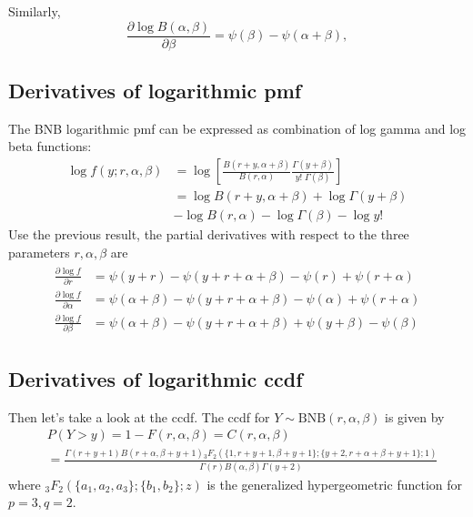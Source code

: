 \documentclass[11pt]{article}
\begin{document}
Similarly,
\begin{equation}
  \frac{\partial \log B(\alpha,\beta)}{\partial \beta} = \psi(\beta) - \psi(\alpha+\beta),
\end{equation}


\subsection*{Derivatives of logarithmic pmf}

 The BNB logarithmic pmf can be expressed as combination of log gamma and log beta functions:
\begin{equation}
\begin{aligned}
	\log f(y;r, \alpha ,\beta) &= \log\left[ \frac {B (r+y,\alpha +\beta )}{B (r,\alpha )} \frac {\Gamma (y+\beta )}{y!\;\Gamma (\beta )} \right] \\
	&= \log B (r+y,\alpha +\beta ) + \log \Gamma (y+\beta ) \\ 
	&- \log B (r,\alpha ) - \log \Gamma (\beta ) - \log y!
\end{aligned}
\end{equation}
Use the previous result, the partial derivatives with respect to the three parameters $r, \alpha, \beta$ are
\begin{subequations}
\begin{gather}
\begin{align}
\frac{\partial \log f}{\partial r} &= \psi(y+r) - \psi(y+r+\alpha+\beta) - \psi(r) + \psi(r+\alpha) \\
\frac{\partial \log f}{\partial \alpha} &= \psi(\alpha+\beta) - \psi(y+r+\alpha+\beta) - \psi(\alpha) + \psi(r+\alpha) \\
\frac{\partial \log f}{\partial \beta} &= \psi(\alpha+\beta) - \psi(y+r+\alpha+\beta) + \psi(y+\beta) - \psi(\beta)
\end{align}
\end{gather}
\end{subequations}


\subsection*{Derivatives of logarithmic ccdf}
Then let's take a look at the ccdf. The ccdf for $Y\sim \text{BNB}(r,\alpha,\beta)$ is given by
\begin{equation}
\begin{aligned}
& P(Y > y) = 1 - F(r,\alpha,\beta) = C(r,\alpha,\beta) \\
&= \frac{\Gamma (r+y +1) B(r+\alpha ,\beta +y +1) {}_3F_2(\{1,r+y +1,\beta +y +1\}; \{y +2,r+\alpha +\beta +y +1\};1)}{\Gamma (r) B(\alpha ,\beta ) \Gamma (y +2)}
\end{aligned}
\end{equation}
where $_3F_2(\{a_1,a_2,a_3\}; \{b_1,b_2\};z)$ is the generalized hypergeometric function \citep[Ch.~16]{olver2010nist} for $p=3,q=2$. 
\end{document}

